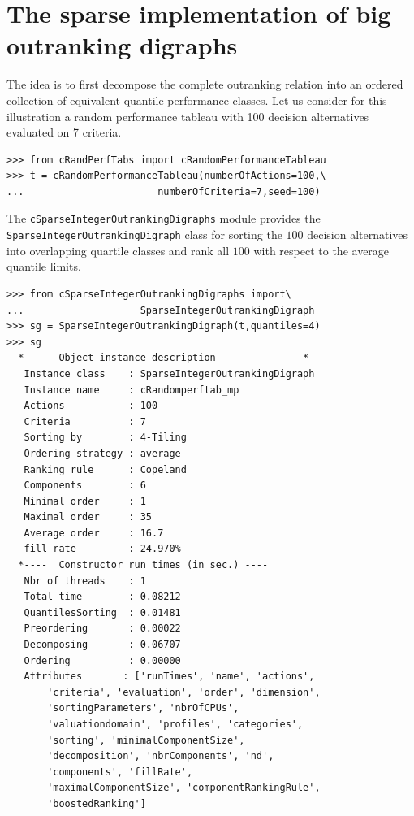\section{The sparse implementation of big outranking digraphs}
\label{sec:11.4}

The idea is to first decompose the complete outranking relation into an ordered collection of equivalent quantile performance classes. Let us consider for this illustration a random performance tableau with 100 decision alternatives evaluated on 7 criteria.
\begin{lstlisting}
>>> from cRandPerfTabs import cRandomPerformanceTableau
>>> t = cRandomPerformanceTableau(numberOfActions=100,\
...                       numberOfCriteria=7,seed=100)
\end{lstlisting}

The \texttt{cSparseIntegerOutrankingDigraphs} module provides the \texttt{Spar\-seIntegerOutrankingDigraph} class for sorting the $100$ decision alternatives into overlapping quartile classes and rank all $100$ with respect to the average quantile limits.
\begin{lstlisting}[caption={Constructing the sparse integer outranking digraph},label=list:11.3]
>>> from cSparseIntegerOutrankingDigraphs import\
...                    SparseIntegerOutrankingDigraph
>>> sg = SparseIntegerOutrankingDigraph(t,quantiles=4)
>>> sg
  *----- Object instance description --------------*
   Instance class    : SparseIntegerOutrankingDigraph
   Instance name     : cRandomperftab_mp
   Actions           : 100
   Criteria          : 7
   Sorting by        : 4-Tiling
   Ordering strategy : average
   Ranking rule      : Copeland
   Components        : 6
   Minimal order     : 1
   Maximal order     : 35
   Average order     : 16.7
   fill rate         : 24.970%
  *----  Constructor run times (in sec.) ----
   Nbr of threads    : 1
   Total time        : 0.08212
   QuantilesSorting  : 0.01481
   Preordering       : 0.00022
   Decomposing       : 0.06707
   Ordering          : 0.00000
   Attributes       : ['runTimes', 'name', 'actions',
       'criteria', 'evaluation', 'order', 'dimension',
       'sortingParameters', 'nbrOfCPUs',
       'valuationdomain', 'profiles', 'categories',
       'sorting', 'minimalComponentSize',
       'decomposition', 'nbrComponents', 'nd',
       'components', 'fillRate',
       'maximalComponentSize', 'componentRankingRule',
       'boostedRanking']
\end{lstlisting}

